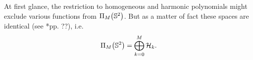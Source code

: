 At first glance, the restriction to homogeneous and harmonic polynomials
might exclude various functions from $\Pi_M{\hspace{-0.4ex}}\left(\mathbb{S}^2\right)$. But as a 
matter of fact these spaces are identical (see \cite{frgesc}*{pp. ??}), i.e. 
\begin{equation}
  \nonumber
    \Pi_M{\hspace{-0.4ex}}\left(\mathbb{S}^2\right) = \bigoplus_{k=0}^{M}\mathcal{H}_k.
\end{equation}

\begin{figure}[htbp]
  \centering
   \hfill
   \hfill
   \\
   \hfill

\end{figure}
